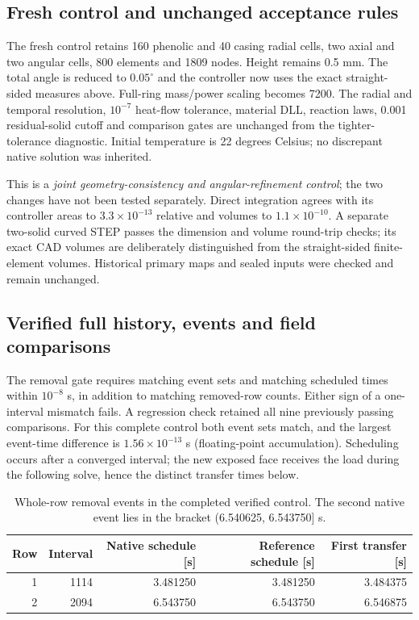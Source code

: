 \documentclass[oneside,openany]{amsdtx}
\begin{document}
\subsection{Fresh control and unchanged acceptance rules}
The fresh control retains 160 phenolic and 40 casing radial cells, two axial and
two angular cells, 800 elements and 1809 nodes. Height remains 0.5 mm.
The total angle is reduced to $0.05^\circ$ and the controller now uses the exact
straight-sided measures above. Full-ring mass/power scaling becomes 7200.
The radial and temporal resolution, $10^{-7}$ heat-flow tolerance, material DLL,
reaction laws, 0.001 residual-solid cutoff and comparison gates are unchanged
from the tighter-tolerance diagnostic. Initial temperature is 22 degrees Celsius;
no discrepant native solution was inherited.

This is a \emph{joint geometry-consistency and angular-refinement control};
the two changes have not been tested separately. Direct integration agrees with
its controller areas to $3.3\times10^{-13}$ relative and volumes to
$1.1\times10^{-10}$. A separate two-solid curved STEP passes the dimension and
volume round-trip checks; its exact CAD volumes are deliberately distinguished
from the straight-sided finite-element volumes. Historical primary maps and
sealed inputs were checked and remain unchanged.

\clearpage
\subsection{Verified full history, events and field comparisons}
The removal gate requires matching event sets and matching scheduled times
within $10^{-8}$ s, in addition to matching removed-row counts. Either sign of
a one-interval mismatch fails. A regression check retained all nine previously
passing comparisons. For this complete control both event sets match, and the largest
event-time difference is $1.56\times10^{-13}$ s (floating-point accumulation).
Scheduling occurs after a converged interval; the new exposed face receives
the load during the following solve, hence the distinct transfer times below.
\begin{table}[H]\centering\small
\begin{tabular}{rrrrr}\toprule
Row & Interval & Native schedule [s] & Reference schedule [s] & First transfer [s]\\\midrule
1 & 1114 & 3.481250 & 3.481250 & 3.484375 \\
2 & 2094 & 6.543750 & 6.543750 & 6.546875 \\
\bottomrule\end{tabular}
\caption{Whole-row removal events in the completed verified control. The second
native event lies in the bracket (6.540625, 6.543750] s.}
\end{table}
\end{document}
